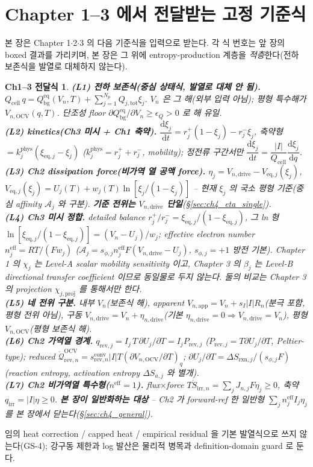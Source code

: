 \documentclass[11pt,a4paper]{article}
\newtheorem*{linkbox}{Ch1--3 전달식}
\newcommand{\dd}{\mathrm{d}}
\newcommand{\eff}{\mathrm{eff}}
\newcommand{\eq}{\mathrm{eq}}
\newcommand{\app}{\mathrm{app}}
\newcommand{\drive}{\mathrm{drive}}
\newcommand{\bg}{\mathrm{bg}}
\newcommand{\cell}{\mathrm{cell}}
\newcommand{\OCV}{\mathrm{OCV}}
\newcommand{\tot}{\mathrm{tot}}
\newcommand{\irr}{\mathrm{irr}}
\newcommand{\rev}{\mathrm{rev}}
\newcommand{\rxn}{\mathrm{rxn}}
\newcommand{\conv}{\mathrm{conv}}
\begin{document}
\section{Chapter 1--3 에서 전달받는 고정 기준식}\label{sec:ch4_inherit}
본 장은 Chapter 1$\cdot$2$\cdot$3 의 다음 기준식을 입력으로 받는다.
각 식 번호는 앞 장의 boxed 결과를 가리키며, 본 장은 그 위에 entropy-production 계층을 \emph{적층}한다(전하
보존식을 발열로 대체하지 않는다).
\begin{linkbox}
\textbf{(L1) 전하 보존식(중심 상태식, 발열로 대체 안 됨).} $Q_\cell\,q=Q_\bg^{\eq}(V_n,T)+\sum_{j=1}^{N_p}Q_{j,\tot}\xi_j$.
$V_n$ 은 그 해(외부 입력 아님); 평형 특수해가 $V_{n,\OCV}(q,T)$. 단조성 floor $\partial Q_\bg^{\eq}/\partial V_n\ge\epsilon_Q>0$
로 해 유일.\\
\textbf{(L2) kinetics(Ch3 미시 + Ch1 축약).} $\dfrac{\dd\xi_j}{\dd t}=r_j^+(1-\xi_j)-r_j^-\xi_j$, 축약형
$=k_j^{\mathrm{phys}}(\xi_{\eq,j}-\xi_j)$ ($k_j^{\mathrm{phys}}=r_j^++r_j^-$, mobility); 정전류 구간서만
$\dfrac{\dd\xi_j}{\dd t}=\dfrac{|I|}{Q_\cell}\dfrac{\dd\xi_j}{\dd q}$.\\
\textbf{(L3) Ch2 dissipation force(비가역 열 공액 force).} $\eta_j=V_{n,\drive}-V_{\eq,j}(\xi_j)$,
$V_{\eq,j}(\xi_j)=U_j(T)+w_j(T)\ln[\xi_j/(1-\xi_j)]$ -- 현재 $\xi_j$ 의 \emph{국소 평형} 기준(중심 affinity
$\mathcal A_j$ 와 구분). \textbf{기준 전위는 $V_{n,\drive}$ 단일}(\S\ref{sec:ch4_eta_single}).\\
\textbf{(L4) Ch3 미시 정합.} detailed balance $r_j^+/r_j^-=\xi_{\eq,j}/(1-\xi_{\eq,j})$, 그 ln 형
$\ln[\xi_{\eq,j}/(1-\xi_{\eq,j})]=(V_n-U_j)/w_j$; effective electron number $n_j^{\eff}=RT/(Fw_j)$ ($\mathcal A_j
=s_{\phi,j}n_j^{\eff}F(V_{n,\drive}-U_j)$, $s_{\phi,j}=+1$ 방전 기본). Chapter 1 의 $\chi_j$ 는 Level-A scalar
mobility sensitivity 이고, Chapter 3 의 $\beta_j$ 는 Level-B directional transfer coefficient 이므로 동일물로
두지 않는다. 둘의 비교는 Chapter 3 의 projection $\chi_{j,\mathrm{proj}}$ 를 통해서만 한다.\\
\textbf{(L5) 네 전위 구분.} 내부 $V_n$(보존식 해), apparent $V_{n,\app}=V_n+s_I|I|R_n$(분극 포함, 평형 전위
아님), 구동 $V_{n,\drive}=V_n+\eta_{n,\drive}$(기본 $\eta_{n,\drive}=0\Rightarrow V_{n,\drive}=V_n$), 평형
$V_{n,\OCV}$(평형 보존식 해).\\
\textbf{(L6) Ch2 가역열 경계.} $q_{\rev,j}=I_j\,T\,\partial U_j/\partial T=I_jP_{\rev,j}$ ($P_{\rev,j}=T\partial U_j/\partial T$,
Peltier-type); reduced $\dot{\mathcal Q}_{\rev,n}^{\OCV}=s_{\rev,n}^{\conv}|I|T(\partial V_{n,\OCV}/\partial T)_q$;
$\partial U_j/\partial T=\Delta S_{\rxn,j}/(s_{\phi,j}F)$ (reaction entropy, activation entropy $\Delta S_{a,j}$
와 별개).\\
\textbf{(L7) Ch2 비가역열 특수형($n^{\eff}=1$).} flux$\times$force $T\dot S_{\irr,n}=\sum_j J_{n,j}F\eta_j\ge0$,
축약 $q_\irr=|I|\eta\ge0$. \textbf{본 장이 일반화하는 대상} -- Ch2 가 forward-ref 한 일반형 $\sum_j n_j^{\eff}I_j\eta_j$
를 본 장에서 닫는다(\S\ref{sec:ch4_general}).
\end{linkbox}
임의 heat correction / capped heat / empirical residual 을 기본 발열식으로 쓰지 않는다(GS-4); 강구동 제한과
log 발산은 물리적 병목과 definition-domain guard 로 둔다.
\end{document}
